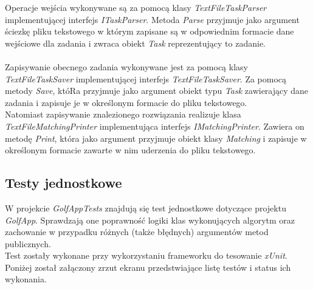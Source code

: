 \documentclass[10pt,a4paper]{article}
\begin{document}
	Operacje wejścia wykonywane są za pomocą klasy \textit{TextFileTaskParser} implementującej interfejs \textit{ITaskParser}. Metoda \textit{Parse} przyjmuje jako argument ściezkę pliku tekstowego w którym zapisane są w odpowiednim formacie dane wejściowe dla zadania i zwraca obiekt \textit{Task} reprezentujący to zadanie. \\~\\
	Zapisywanie obecnego zadania wykonywane jest za pomocą klasy \textit{TextFileTaskSaver} implementującej interfejs \textit{TextFileTaskSaver}. Za pomocą metody \textit{Save}, któRa przyjmuje jako argument obiekt typu \textit{Task} zawierający dane zadania i zapisuje je w określonym formacie do pliku tekstowego.\\
	Natomiast zapisywanie znalezionego rozwiązania realizuje klasa \textit{TextFileMatchingPrinter} implementująca interfejs \textit{IMatchingPrinter}. Zawiera on metodę \textit{Print}, która jako argument przyjmuje obiekt klasy \textit{Matching} i zapisuje w określonym formacie zawarte w nim uderzenia do pliku tekstowego.
		
	\subsection{Testy jednostkowe}
	
	W projekcie \textit{GolfAppTests} znajdują się test jednostkowe dotyczące projektu \textit{GolfApp}. Sprawdzają one poprawność logiki klas wykonujących algorytm oraz zachowanie w przypadku różnych (także błędnych) argumentów metod publicznych. \\
	Test zostały wykonane przy wykorzystaniu frameworku do tesowanie \textit{xUnit}. Poniżej został załączony zrzut ekranu przedstwiające listę testów i status ich wykonania. 
	
\end{document}
